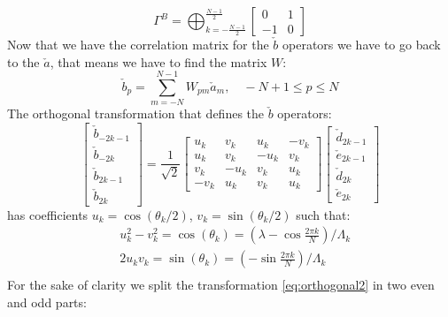 \documentclass[12pt,a4paper]{book}
\theoremstyle{definition}
\begin{document}
\begin{equation}\label{eq:corrmatrb}\Gamma^{B}=\bigoplus_{k=-\frac{N-1}{2}}^{\frac{N-1}{2}}\left[\begin{array}{rr}
		0 & 1 \\
		-1 & 0
	\end{array}\right]\end{equation}
Now that we have the correlation matrix for the $\check{b}$ operators we have to go back to the $\check{a}$, that means we have to find the matrix $W$:
\begin{equation}\label{eq:wmatrix}\check{b}_{p}=\sum_{m=-N}^{N-1} W_{p m} \check{a}_{m}, \quad-N+1 \leq p \leq N\end{equation}
The orthogonal transformation that defines the $\check{b}$ operators:
\begin{equation}\label{eq:orthogonal2}\left[\begin{array}{c}
		\check{b}_{-2 k-1} \\
		\check{b}_{-2 k} \\
		\check{b}_{2 k-1} \\
		\check{b}_{2 k}
	\end{array}\right]=\frac{1}{\sqrt{2}}\left[\begin{array}{cccc}
		u_{k} & v_{k} & u_{k} & -v_{k} \\
		u_{k} & v_{k} & -u_{k} & v_{k} \\
		v_{k} & -u_{k} & v_{k} & u_{k} \\
		-v_{k} & u_{k} & v_{k} & u_{k}
	\end{array}\right]\left[\begin{array}{c}
		\check{d}_{2 k-1} \\
		\check{e}_{2 k-1} \\
		\check{d}_{2 k} \\
		\check{e}_{2 k}
	\end{array}\right]\end{equation}
has coefficients $u_k=\cos(\theta_k/2)$, $v_k=\sin(\theta_k/2)$ such that:
\begin{equation}\begin{aligned}
		&u_k^2-v_k^2=\cos(\theta_k)=\left(\lambda-\cos \frac{2 \pi k }{N}\right)/\Lambda_k\\
		&2u_kv_k=\sin(\theta_k)=\left(-\sin \frac{2 \pi k }{N}\right)/\Lambda_k\\
	\end{aligned}
\end{equation} 
For the sake of clarity we split the transformation \ref{eq:orthogonal2} in two even and odd parts:
\end{document}
